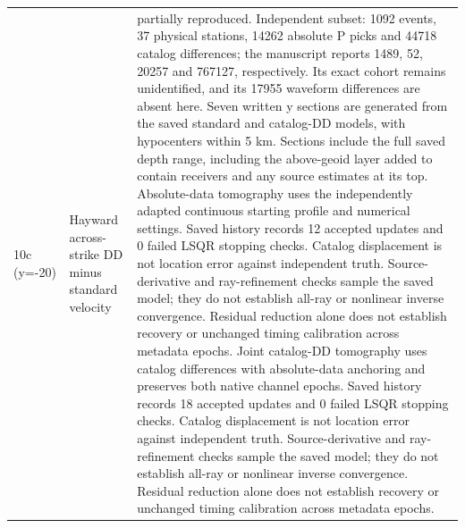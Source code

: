 \begin{longtable}{>{\raggedright\arraybackslash}p{}>{\raggedright\arraybackslash}p{}>{\raggedright\arraybackslash}p{}}
10c (y=-20) & Hayward across-strike DD minus standard velocity & partially reproduced. Independent subset: 1092 events, 37 physical stations, 14262 absolute P picks and 44718 catalog differences; the manuscript reports 1489, 52, 20257 and 767127, respectively. Its exact cohort remains unidentified, and its 17955 waveform differences are absent here. Seven written y sections are generated from the saved standard and catalog-DD models, with hypocenters within 5 km. Sections include the full saved depth range, including the above-geoid layer added to contain receivers and any source estimates at its top. Absolute-data tomography uses the independently adapted continuous starting profile and numerical settings. Saved history records 12 accepted updates and 0 failed LSQR stopping checks. Catalog displacement is not location error against independent truth. Source-derivative and ray-refinement checks sample the saved model; they do not establish all-ray or nonlinear inverse convergence. Residual reduction alone does not establish recovery or unchanged timing calibration across metadata epochs. Joint catalog-DD tomography uses catalog differences with absolute-data anchoring and preserves both native channel epochs. Saved history records 18 accepted updates and 0 failed LSQR stopping checks. Catalog displacement is not location error against independent truth. Source-derivative and ray-refinement checks sample the saved model; they do not establish all-ray or nonlinear inverse convergence. Residual reduction alone does not establish recovery or unchanged timing calibration across metadata epochs.\\

\end{longtable}
